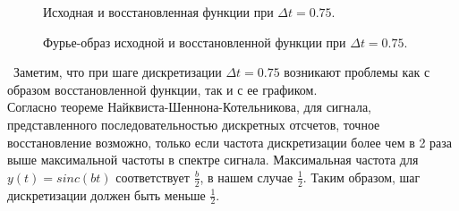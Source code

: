 \documentclass[a5paper, 10pt]{article}
\theoremstyle{definition}
\theoremstyle{plain}
\theoremstyle{remark}
\begin{document}
\begin{figure}[h!]
\caption{Исходная и восстановленная функции при $\Delta t = 0.75$.}
\caption{Фурье-образ исходной и восстановленной функции при $\Delta t = 0.75$.}
\end{figure}
\newpage
\,
\newpage
Заметим, что при шаге дискретизации $\Delta t = 0.75$ возникают проблемы как с образом восстановленной функции, так и с ее графиком. \\

Согласно теореме Найквиста-Шеннона-Котельникова, для сигнала, представленного последовательностью дискретных отсчетов, точное восстановление возможно, только если частота дискретизации более чем в 2 раза выше максимальной частоты в спектре сигнала. Максимальная частота для $y(t) = sinc(bt)$ соответствует $\frac{b}{2}$, в нашем случае $\frac{1}{2}$. Таким образом, шаг дискретизации должен быть меньше $\frac{1}{2}$.
\end{document}
